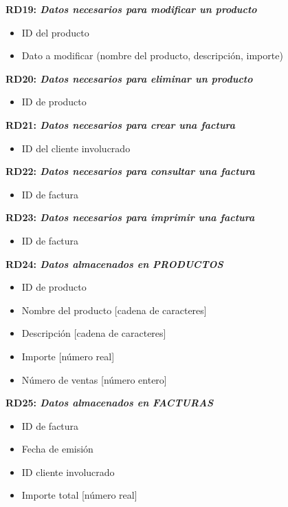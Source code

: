 \documentclass[paper=a4, fontsize=11pt, spanish]{scrartcl}
\begin{document}
	\setlength{\parindent}{0em}
	\textbf{RD19: \textit{Datos necesarios para modificar un producto}}
	\setlength{\parindent}{2em}
	\begin{itemize}
		\item ID del producto
		\item Dato a modificar (nombre del producto, descripción, importe)
	\end{itemize}

	\setlength{\parindent}{0em}
	\textbf{RD20: \textit{Datos necesarios para eliminar un producto}}
	\setlength{\parindent}{2em}
	\begin{itemize}
		\item ID de producto
	\end{itemize}

	\setlength{\parindent}{0em}
	\textbf{RD21: \textit{Datos necesarios para crear una factura}}
	\setlength{\parindent}{2em}
	\begin{itemize}
		\item ID del cliente involucrado
	\end{itemize}

	\setlength{\parindent}{0em}
	\textbf{RD22: \textit{Datos necesarios para consultar una factura}}
	\setlength{\parindent}{2em}
	\begin{itemize}
		\item ID de factura
	\end{itemize}

	\setlength{\parindent}{0em}
	\textbf{RD23: \textit{Datos necesarios para imprimir una factura}}
	\setlength{\parindent}{2em}
	\begin{itemize}
		\item ID de factura
	\end{itemize}

	\setlength{\parindent}{0em}
	\textbf{RD24: \textit{Datos almacenados en PRODUCTOS}}
	\setlength{\parindent}{2em}
	\begin{itemize}
		\item ID de producto
		\item Nombre del producto [cadena de caracteres]
		\item Descripción [cadena de caracteres]
		\item Importe [número real]
		\item Número de ventas [número entero]
	\end{itemize}

	\setlength{\parindent}{0em}
	\textbf{RD25: \textit{Datos almacenados en FACTURAS}}
	\setlength{\parindent}{2em}
	\begin{itemize}
		\item ID de factura
		\item Fecha de emisión
		\item ID cliente involucrado
		\item Importe total [número real]
	\end{itemize}
\end{document}
